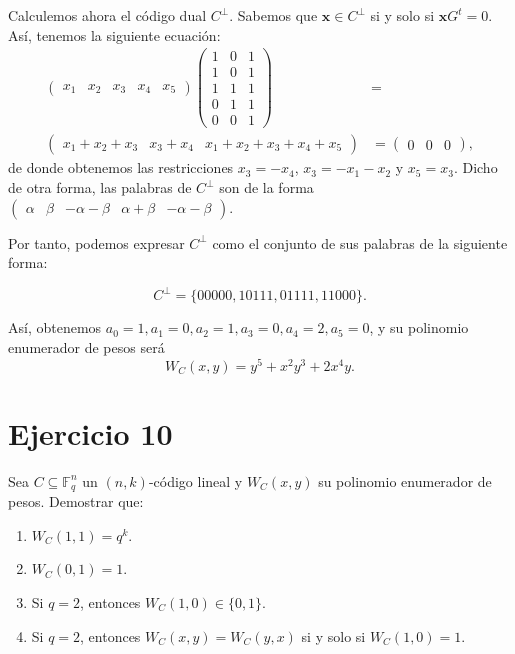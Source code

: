 \begin{enumerate}[label=\alph*)]
	Calculemos ahora el código dual $C^\perp$. Sabemos que $\textbf{x}\in C^\perp$ si y solo si $\textbf{x}G^t = 0$. Así, tenemos la siguiente ecuación:
	\begin{align*}
		\begin{pmatrix}
			x_1 & x_2 & x_3 & x_4 & x_5
		\end{pmatrix}\begin{pmatrix}
			1 & 0 & 1 \\
			1 & 0 & 1 \\
			1 & 1 & 1 \\
			0 & 1 & 1 \\
			0 & 0 & 1
		\end{pmatrix} &= \\
		\begin{pmatrix}
			x_1 + x_2 + x_3 & x_3 + x_4 & x_1 + x_2 + x_3 + x_4 + x_5
		\end{pmatrix} &= \begin{pmatrix}
			0 & 0 & 0
		\end{pmatrix},
	\end{align*}
	de donde obtenemos las restricciones $x_3 = -x_4$, $x_3 = -x_1 - x_2$ y $x_5 = x_3$. Dicho de otra forma, las palabras de $C^\perp$ son de la forma $\begin{pmatrix}
		\alpha & \beta & -\alpha-\beta & \alpha+\beta & -\alpha-\beta
	\end{pmatrix}$.

	Por tanto, podemos expresar $C^\perp$ como el conjunto de sus palabras de la siguiente forma:
	
	\[C^\perp = \{00000, 10111, 01111, 11000\}.\]
	
	Así, obtenemos $a_0 = 1, a_1 = 0, a_2 = 1, a_3 = 0, a_4 = 2, a_5 = 0$, y su polinomio enumerador de pesos será
	\[W_C(x, y) = y^5 + x^2y^3 + 2x^4y.\]
	
\end{enumerate}

\section{Ejercicio 10}

\begin{formulationBox}
	Sea $C\subseteq \mathbb{F}_q^n$ un $(n,k)$-código lineal y $W_C(x,y)$ su polinomio enumerador de pesos. Demostrar que:
	\begin{enumerate}[label=\alph*)]
		\item $W_C(1,1) = q^k$.
		\item $W_C(0,1) = 1$.
		\item Si $q = 2$, entonces $W_C(1,0)\in\{0, 1\}$.
		\item Si $q = 2$, entonces $W_C(x,y) = W_C(y, x)$ si y solo si $W_C(1,0) = 1$.
	\end{enumerate}
\end{formulationBox}

